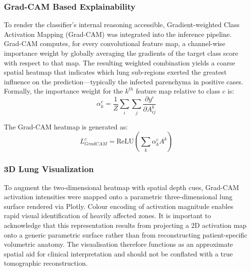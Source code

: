 \documentclass[conference]{IEEEtran}
\begin{document}

\subsubsection{Grad-CAM Based Explainability}

To render the classifier's internal reasoning accessible, Gradient-weighted Class Activation Mapping (Grad-CAM) was integrated into the inference pipeline. Grad-CAM computes, for every convolutional feature map, a channel-wise importance weight by globally averaging the gradients of the target class score with respect to that map. The resulting weighted combination yields a coarse spatial heatmap that indicates which lung sub-regions exerted the greatest influence on the prediction—typically the infected parenchyma in positive cases. Formally, the importance weight for the $k^{th}$ feature map relative to class $c$ is:
\begin{equation}
\alpha_k^c = \frac{1}{Z} \sum_{i}\sum_{j} \frac{\partial y^c}{\partial A_{ij}^k}
\end{equation}

The Grad-CAM heatmap is generated as:
\begin{equation}
L_{GradCAM}^c = \text{ReLU}\left(\sum_k \alpha_k^c A^k\right)
\end{equation}


\subsubsection{3D Lung Visualization}

To augment the two-dimensional heatmap with spatial depth cues, Grad-CAM activation intensities were mapped onto a parametric three-dimensional lung surface rendered via Plotly. Colour encoding of activation magnitude enables rapid visual identification of heavily affected zones. It is important to acknowledge that this representation results from projecting a 2D activation map onto a generic parametric surface rather than from reconstructing patient-specific volumetric anatomy. The visualisation therefore functions as an approximate spatial aid for clinical interpretation and should not be conflated with a true tomographic reconstruction.

\end{document}
